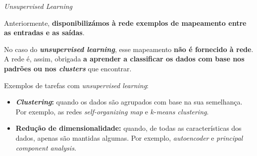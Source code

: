 \begin{frame}{\textit{Unsupervised Learning}}

Anteriormente, \textbf{disponibilizámos à rede exemplos de mapeamento entre as entradas e as saídas}. 

\pauseskip

No caso do \textbf{\textit{unsupervised learning}}, esse mapeamento \textbf{não é fornecido à rede}. A rede é, assim, obrigada \textbf{a aprender a classificar os dados com base nos padrões ou nos \textit{clusters}} que encontrar.

\pauseskip

Exemplos de tarefas com \textit{unsupervised learning}:
\begin{itemize}
    \item \textbf{\textit{Clustering}:} quando os dados são agrupados com base na sua semelhança. Por exemplo, as redes \textit{self-organizing map} e $k$-\textit{means clustering}.
    \item \textbf{Redução de dimensionalidade:} quando, de todas as características dos dados, apenas são mantidas algumas. Por exemplo, \textit{autoencoder} e \textit{principal component analysis}.
\end{itemize}


\end{frame}

